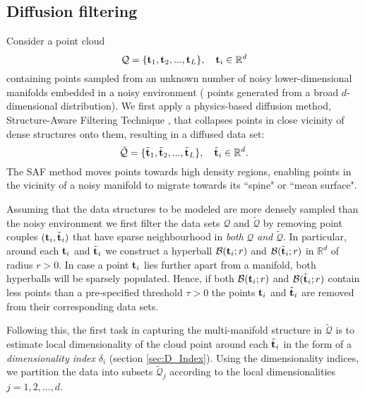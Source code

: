 \subsection{Diffusion filtering} \label{sec:SAF}
Consider a point cloud
\[\mathcal{Q} =\{\boldsymbol{\mathbf{t}}_1, \boldsymbol{\mathbf{t}}_2,...,\boldsymbol{\mathbf{t}}_L\},\quad \boldsymbol{\mathbf{t}}_i \in \mathbb{R}^d\]
containing points sampled from an unknown number of noisy lower-dimensional manifolds embedded in a noisy environment (\eg{} points generated from a broad $d$-dimensional distribution).
We first apply a physics-based diffusion method, Structure-Aware Filtering Technique \citep[SAF,][]{Wu2018}, that collapses points in close vicinity of dense structures onto them, resulting in a diffused data set:
\[\tilde{\mathcal{Q}} =\{\tilde{\boldsymbol{\mathbf{t}}}_1, \tilde{\boldsymbol{\mathbf{t}}}_2,...,\tilde{\boldsymbol{\mathbf{t}}}_L\},\quad \tilde{\boldsymbol{\mathbf{t}}}_i \in \mathbb{R}^d.\]
The SAF method moves points towards high density regions, enabling points in the vicinity of a noisy manifold to migrate towards its ``spine" or ``mean surface".

Assuming that the data structures to be modeled are more densely sampled than the noisy environment
we first filter the data sets $\mathcal{Q}$ and $\tilde{\mathcal{Q}}$ by removing point couples $(\boldsymbol{\mathbf{t}}_i,\tilde{\boldsymbol{\mathbf{t}}}_i)$ that have sparse neighbourhood in \emph{both} $\mathcal{Q}$ \emph{and} $\tilde{\mathcal{Q}}$.
In particular, around each $\boldsymbol{\mathbf{t}}_i$ and $\tilde{\boldsymbol{\mathbf{t}}}_i$ we construct a hyperball $\mathcal{B}(\boldsymbol{\mathbf{t}}_i;r)$ and $\mathcal{B}(\tilde{\boldsymbol{\mathbf{t}}}_i;r)$ in $\mathbb{R}^d$ of radius $r>0$.
In case a point $\boldsymbol{\mathbf{t}}_i$ lies further apart from a manifold, both hyperballs will be sparsely populated.
Hence, if both $\mathcal{B}(\boldsymbol{\mathbf{t}}_i;r)$ and $\mathcal{B}(\tilde{\boldsymbol{\mathbf{t}}}_i;r)$ contain less points than a pre-specified threshold $\tau>0$ the points $\boldsymbol{\mathbf{t}}_i$ and $\tilde{\boldsymbol{\mathbf{t}}}_i$ are removed from their corresponding data sets.

Following this, the first task in capturing the multi-manifold structure in $\tilde{\mathcal{Q}}$ is to estimate local dimensionality of the cloud point around each $\tilde{\boldsymbol{\mathbf{t}}}_i$
in the form of a \emph{dimensionality index} $\delta_i$ (section \ref{sec:D_Index}).
Using the dimensionality indices, we partition the data into subsets $\tilde{\mathcal{Q}}_j$ according to the local dimensionalities $j=1,2,...,d$.

